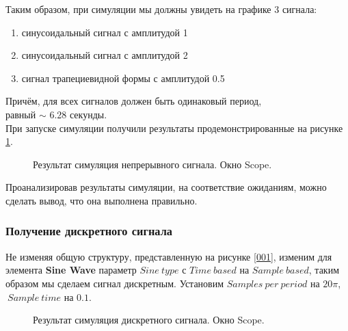 \documentclass[a4paper,14pt]{extarticle}
\begin{document}
Таким образом, при симуляции мы должны увидеть на графике 3 
сигнала:
\begin{enumerate}
\item синусоидальный сигнал с амплитудой 1
\item синусоидальный сигнал с амплитудой 2
\item сигнал трапециевидной формы с амплитудой 0.5
\end{enumerate}

Причём, для всех сигналов должен быть одинаковый период,\\ равный 
$\sim$ 6.28 секунды.\\

При запуске симуляции получили результаты продемонстрированные на 
рисунке \ref{002}.

\begin{figure}[H]
\caption{Результат симуляция непрерывного сигнала. Окно Scope.}
\label{002}
\end{figure}

Проанализировав результаты симуляции, на соответствие ожиданиям, 
можно сделать вывод, что она выполнена правильно.

\subsubsection{Получение дискретного сигнала}

Не изменяя общую структуру, представленную на рисунке \ref{001}, 
изменим для элемента \textbf{Sine Wave} параметр $Sine \ type$ с 
$Time \ based$ на $Sample \ based$, таким образом мы сделаем 
сигнал дискретным. Установим $Samples \ per \ period$ на $20\pi$, 
$\ Sample \ time$ на $0.1$.

\begin{figure}[H]
\caption{Результат симуляция дискретного сигнала. Окно Scope.}
\label{003}
\end{figure}
\end{document}
